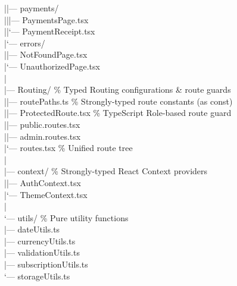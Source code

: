 \documentclass[11pt,a4paper]{article}
\begin{document}
{|\hspace{1.5em}|--- payments/\\
|\hspace{1.5em}|\hspace{1.5em}|--- PaymentsPage.tsx\\
|\hspace{1.5em}|\hspace{1.5em}`--- PaymentReceipt.tsx\\
|\hspace{1.5em}`--- errors/\\
|\hspace{3.0em}|--- NotFoundPage.tsx\\
|\hspace{3.0em}`--- UnauthorizedPage.tsx\\
|\\
|--- Routing/ \hfill\textcolor{medgray}{\% Typed Routing configurations \& route guards}\\
|\hspace{1.5em}|--- routePaths.ts \hfill\textcolor{medgray}{\% Strongly-typed route constants (as const)}\\
|\hspace{1.5em}|--- ProtectedRoute.tsx \hfill\textcolor{medgray}{\% TypeScript Role-based route guard}\\
|\hspace{1.5em}|--- public.routes.tsx\\
|\hspace{1.5em}|--- admin.routes.tsx\\
|\hspace{1.5em}`--- routes.tsx \hfill\textcolor{medgray}{\% Unified route tree}\\
|\\
|--- context/ \hfill\textcolor{medgray}{\% Strongly-typed React Context providers}\\
|\hspace{1.5em}|--- AuthContext.tsx\\
|\hspace{1.5em}`--- ThemeContext.tsx\\
|\\
`--- utils/ \hfill\textcolor{medgray}{\% Pure utility functions}\\
\hspace{2.2em}|--- dateUtils.ts\\
\hspace{2.2em}|--- currencyUtils.ts\\
\hspace{2.2em}|--- validationUtils.ts\\
\hspace{2.2em}|--- subscriptionUtils.ts\\
\hspace{2.2em}`--- storageUtils.ts
}
\end{document}
